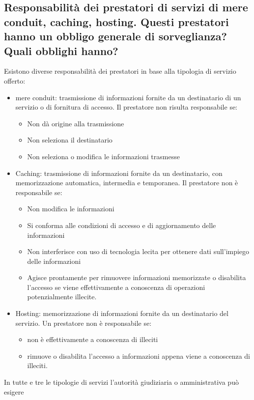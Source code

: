 \subsection{Responsabilità dei prestatori di servizi di mere conduit, caching, hosting. Questi prestatori
hanno un obbligo generale di sorveglianza? Quali obblighi hanno?}
Esistono diverse responsabilità dei prestatori in base alla tipologia di servizio offerto:
\begin{itemize}
    \item mere conduit: trasmissione di informazioni fornite da un destinatario di un servizio o di fornitura di accesso.
    Il prestatore non risulta responsabile se:
    \begin{itemize}
        \item Non dà origine alla trasmissione
        \item Non seleziona il destinatario
        \item Non seleziona o modifica le informazioni trasmesse
    \end{itemize}
    \item Caching: trasmissione di informazioni fornite da un destinatario, con
        memorizzazione automatica, intermedia e temporanea.
    Il prestatore non è responsabile se:
    \begin{itemize}
        \item Non modifica le informazioni
        \item Si conforma alle condizioni di accesso e di aggiornamento delle informazioni
        \item Non interferisce con uso di tecnologia lecita per ottenere dati sull'impiego delle informazioni
        \item Agisce prontamente per rimuovere informazioni memorizzate o disabilita
            l'accesso se viene effettivamente a conoscenza di operazioni potenzialmente
            illecite.
    \end{itemize}
   \item Hosting: memorizzazione di informazioni fornite da un destinatario del servizio.
   Un prestatore non è responsabile se:
   \begin{itemize}
       \item non è effettivamente a conoscenza di illeciti
       \item rimuove o disabilita l'accesso a informazioni appena viene a conoscenza di illeciti.
   \end{itemize}
\end{itemize}
In tutte e tre le tipologie di servizi l'autorità giudiziaria o amministrativa può esigere
